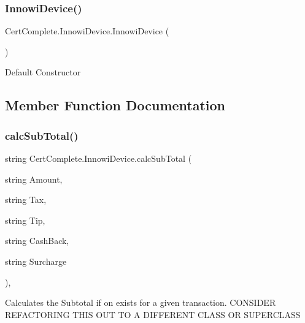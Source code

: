 \subsubsection{\texorpdfstring{Innowi\+Device()}{InnowiDevice()}}
{\footnotesize\ttfamily Cert\+Complete.\+Innowi\+Device.\+Innowi\+Device (\begin{DoxyParamCaption}{ }\end{DoxyParamCaption})\hspace{0.3cm}{\ttfamily [inline]}}



Default Constructor 



\subsection{Member Function Documentation}
\mbox{\label{class_cert_complete_1_1_innowi_device_a6be1ef3889195a5b3d3b81306c77608b}} 
\subsubsection{\texorpdfstring{calc\+Sub\+Total()}{calcSubTotal()}}
{\footnotesize\ttfamily string Cert\+Complete.\+Innowi\+Device.\+calc\+Sub\+Total (\begin{DoxyParamCaption}\item[{string}]{Amount,  }\item[{string}]{Tax,  }\item[{string}]{Tip,  }\item[{string}]{Cash\+Back,  }\item[{string}]{Surcharge }\end{DoxyParamCaption})\hspace{0.3cm}{\ttfamily [inline]}, {\ttfamily [private]}}



Calculates the Subtotal if on exists for a given transaction. C\+O\+N\+S\+I\+D\+ER R\+E\+F\+A\+C\+T\+O\+R\+I\+NG T\+H\+IS O\+UT TO A D\+I\+F\+F\+E\+R\+E\+NT C\+L\+A\+SS OR S\+U\+P\+E\+R\+C\+L\+A\+SS 


